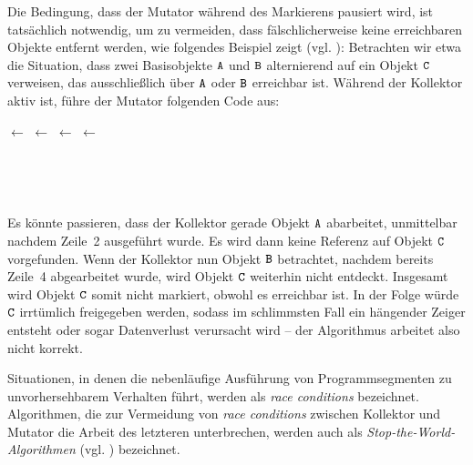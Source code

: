 Die Bedingung, dass der Mutator während des Markierens pausiert wird, ist tatsächlich notwendig, um zu vermeiden, dass fälschlicherweise keine erreichbaren Objekte entfernt werden, wie folgendes Beispiel zeigt (vgl. \cite[969]{dijkstra1978}):
Betrachten wir etwa die Situation, dass zwei Basisobjekte $\texttt{A}$ und $\texttt{B}$ alternierend auf ein Objekt $\texttt{C}$ verweisen, das ausschließlich über $\texttt{A}$ oder $\texttt{B}$ erreichbar ist.
Während der Kollektor aktiv ist, führe der Mutator folgenden Code aus:

\begin{center}
\begin{minipage}{0.3\textwidth}
	\centering
	\begin{algorithmic}[1]
		\State {} $\gets$ 
		\State {} $\gets$ \Null
		\State {} $\gets$ 
		\State {} $\gets$ \Null
	\end{algorithmic}
\end{minipage}~
\begin{minipage}{0.3\textwidth}
	\centering
	
\end{minipage}~
\begin{minipage}{0.3\textwidth}
	\centering
	
\end{minipage}
\end{center}

Es könnte passieren, dass der Kollektor gerade Objekt $\texttt{A}$ abarbeitet, unmittelbar nachdem Zeile~2 ausgeführt wurde.
Es wird dann keine Referenz auf Objekt $\texttt{C}$ vorgefunden.
Wenn der Kollektor nun Objekt $\texttt{B}$ betrachtet, nachdem bereits Zeile~4 abgearbeitet wurde, wird Objekt $\texttt{C}$ weiterhin nicht entdeckt.
Insgesamt wird Objekt $\texttt{C}$ somit nicht markiert, obwohl es erreichbar ist.
In der Folge würde $\texttt{C}$ irrtümlich freigegeben werden, sodass im schlimmsten Fall ein hängender Zeiger entsteht oder sogar Datenverlust verursacht wird -- der Algorithmus arbeitet also nicht korrekt.

Situationen, in denen die nebenläufige Ausführung von Programmsegmenten zu unvorhersehbarem Verhalten führt, werden als \textit{race conditions} bezeichnet.
Algorithmen, die zur Vermeidung von \textit{race conditions} zwischen Kollektor und Mutator die Arbeit des letzteren unterbrechen, werden auch als \textit{Stop-the-World-Algorithmen} (vgl. \cite[S. 17]{handbook}) bezeichnet.





